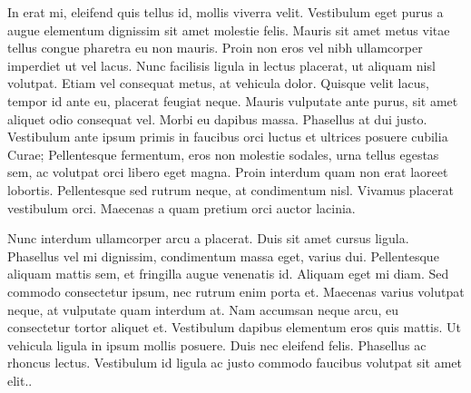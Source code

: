In erat mi, eleifend quis tellus id, mollis viverra velit. Vestibulum eget purus a augue elementum dignissim sit amet molestie felis. Mauris sit amet metus vitae tellus congue pharetra eu non mauris. Proin non eros vel nibh ullamcorper imperdiet ut vel lacus. Nunc facilisis ligula in lectus placerat, ut aliquam nisl volutpat. Etiam vel consequat metus, at vehicula dolor. Quisque velit lacus, tempor id ante eu, placerat feugiat neque. Mauris vulputate ante purus, sit amet aliquet odio consequat vel. Morbi eu dapibus massa. Phasellus at dui justo. Vestibulum ante ipsum primis in faucibus orci luctus et ultrices posuere cubilia Curae; Pellentesque fermentum, eros non molestie sodales, urna tellus egestas sem, ac volutpat orci libero eget magna. Proin interdum quam non erat laoreet lobortis. Pellentesque sed rutrum neque, at condimentum nisl. Vivamus placerat vestibulum orci. Maecenas a quam pretium orci auctor lacinia.


Nunc interdum ullamcorper arcu a placerat. Duis sit amet cursus ligula. Phasellus vel mi dignissim, condimentum massa eget, varius dui. Pellentesque aliquam mattis sem, et fringilla augue venenatis id. Aliquam eget mi diam. Sed commodo consectetur ipsum, nec rutrum enim porta et. Maecenas varius volutpat neque, at vulputate quam interdum at. Nam accumsan neque arcu, eu consectetur tortor aliquet et. Vestibulum dapibus elementum eros quis mattis. Ut vehicula ligula in ipsum mollis posuere. Duis nec eleifend felis. Phasellus ac rhoncus lectus. Vestibulum id ligula ac justo commodo faucibus volutpat sit amet elit..

